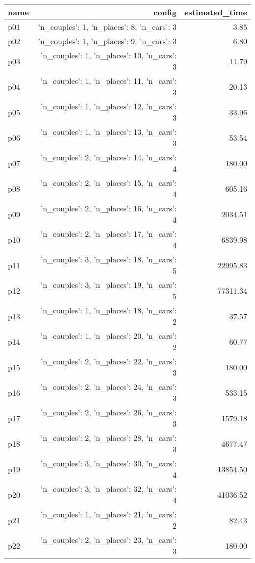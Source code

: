 \documentclass{article}
\begin{document}
                            \begin{center}
                            \scriptsize
                            \begin{tabular}{@{}l|r|r@{}}
                            name & config & estimated\_time\\\midrule
                              p01&{'n\_couples': 1, 'n\_places': 8, 'n\_cars': 3}&3.85\\
  p02&{'n\_couples': 1, 'n\_places': 9, 'n\_cars': 3}&6.80\\
  p03&{'n\_couples': 1, 'n\_places': 10, 'n\_cars': 3}&11.79\\
  p04&{'n\_couples': 1, 'n\_places': 11, 'n\_cars': 3}&20.13\\
  p05&{'n\_couples': 1, 'n\_places': 12, 'n\_cars': 3}&33.96\\
  p06&{'n\_couples': 1, 'n\_places': 13, 'n\_cars': 3}&53.54\\
  p07&{'n\_couples': 2, 'n\_places': 14, 'n\_cars': 4}&180.00\\
  p08&{'n\_couples': 2, 'n\_places': 15, 'n\_cars': 4}&605.16\\
  p09&{'n\_couples': 2, 'n\_places': 16, 'n\_cars': 4}&2034.51\\
  p10&{'n\_couples': 2, 'n\_places': 17, 'n\_cars': 4}&6839.98\\
  p11&{'n\_couples': 3, 'n\_places': 18, 'n\_cars': 5}&22995.83\\
  p12&{'n\_couples': 3, 'n\_places': 19, 'n\_cars': 5}&77311.34\\
  p13&{'n\_couples': 1, 'n\_places': 18, 'n\_cars': 2}&37.57\\
  p14&{'n\_couples': 1, 'n\_places': 20, 'n\_cars': 2}&60.77\\
  p15&{'n\_couples': 2, 'n\_places': 22, 'n\_cars': 3}&180.00\\
  p16&{'n\_couples': 2, 'n\_places': 24, 'n\_cars': 3}&533.15\\
  p17&{'n\_couples': 2, 'n\_places': 26, 'n\_cars': 3}&1579.18\\
  p18&{'n\_couples': 2, 'n\_places': 28, 'n\_cars': 3}&4677.47\\
  p19&{'n\_couples': 3, 'n\_places': 30, 'n\_cars': 4}&13854.50\\
  p20&{'n\_couples': 3, 'n\_places': 32, 'n\_cars': 4}&41036.52\\
  p21&{'n\_couples': 1, 'n\_places': 21, 'n\_cars': 2}&82.43\\
  p22&{'n\_couples': 2, 'n\_places': 23, 'n\_cars': 3}&180.00\\

\end{tabular}
\end{center}
\end{document}
